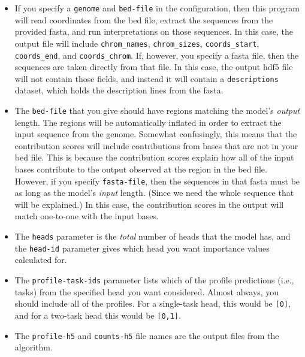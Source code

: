 \documentclass{article}
\begin{document}
\begin{itemize}
    \item If you specify a \texttt{genome} and \texttt{bed-file} in the
        configuration, then this program will read coordinates from the bed
        file, extract the sequences from the provided fasta, and run
        interpretations on those sequences.
        In this case, the output file will include \texttt{chrom\_names},
        \texttt{chrom\_sizes}, \texttt{coords\_start}, \texttt{coords\_end},
        and \texttt{coords\_chrom}.
        If, however, you specify a fasta file, then the sequences are taken
        directly from that file.
        In this case, the output hdf5 file will not contain those fields, and
        instead it will contain a \texttt{descriptions} dataset, which holds
        the description lines from the fasta.
    \item The \texttt{bed-file} that you give should have regions matching the
        model's \emph{output} length. The regions will be automatically inflated
        in order to extract the input sequence from the genome.
        Somewhat confusingly, this means that the contribution scores will
        include contributions from bases that are not in your bed file.
        This is because the contribution scores explain how all of the input
        bases contribute to the output observed at the region in the bed file.
        However, if you specify \texttt{fasta-file}, then the sequences in that
        fasta must be as long as the model's \emph{input} length.
        (Since we need the whole sequence that will be explained.)
        In this case, the contribution scores in the output will match
        one-to-one with the input bases.
    \item The \texttt{heads} parameter is the \emph{total} number of heads that
        the model has, and the \texttt{head-id} parameter gives which head you
        want importance values calculated for.
    \item The \texttt{profile-task-ids} parameter lists which of the profile
        predictions (i.e., tasks) from the specified head you want considered.
        Almost always, you should include all of the profiles.
        For a single-task head, this would be \texttt{[0]}, and for a two-task
        head this would be \texttt{[0,1]}.
    \item The \texttt{profile-h5} and \texttt{counts-h5} file names are the
        output files from the algorithm.
\end{itemize}
\end{document}
